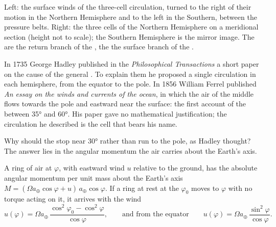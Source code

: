 \begin{omfigure}
{\small Left: the surface winds of the three-cell circulation, turned to the right
of their motion in the Northern Hemisphere and to the left in the Southern, between
the pressure belts. Right: the three cells of the Northern Hemisphere on a
meridional section (height not to scale); the Southern Hemisphere is the mirror
image. The  are the return branch of the , the  the
surface branch of the .}
\label{fig:b1:atmospheric-circulation:three-cells}
\end{omfigure}

\begin{history}
In 1735 George Hadley published in the \emph{Philosophical Transactions} a short paper
on the cause of the general . To explain them he proposed a single
circulation in each hemisphere, from the equator to the pole.
In 1856 William Ferrel published \emph{An essay on the winds and currents of the
ocean}, in which the air of the middle  flows towards the pole and eastward
near the surface: the first account of the  between \ang{35} and \ang{60}.
His paper gave no mathematical justification; the circulation he described is the
cell that bears his name.
\end{history}

Why should the  stop near \ang{30} rather than run to the pole, as Hadley
thought? The answer lies in the angular momentum the air carries about the Earth's
axis.

\begin{proposition}\label{prop:b1:atmospheric-circulation:angular-momentum}
A ring of air at  $\varphi$, with eastward wind $u$ relative to the ground,
has the absolute angular momentum per unit mass about the Earth's axis $M =
(\Omega a_\oplus\cos\varphi + u)\,a_\oplus\cos\varphi$. If a ring at rest at the
 $\varphi_0$ moves to $\varphi$ with no torque acting on it, it arrives with
the wind
\[
  u(\varphi) = \Omega a_\oplus\,\frac{\cos^2\varphi_0 - \cos^2\varphi}{\cos\varphi},
  \qquad\text{and from the equator}\qquad
  u(\varphi) = \Omega a_\oplus\,\frac{\sin^2\varphi}{\cos\varphi} .
\]
\end{proposition}

